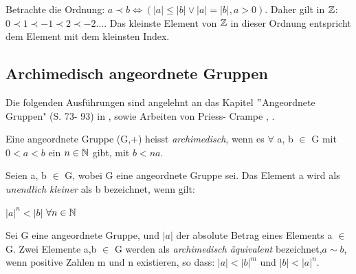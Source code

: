 %
\begin{bsp}
Betrachte die Ordnung: $ a\prec b \Leftrightarrow (|a| \le|b| \vee |a| = |b|, a > 0).$ \newline %
Daher gilt in $\mathbb{Z}$: $ 0 \prec 1 \prec -1 \prec 2 \prec -2 ...$. \newline
Das kleinste Element von $\mathbb{Z}$ in dieser Ordnung entspricht dem Element mit dem kleinsten Index. 
\end{bsp}
\subsection{Archimedisch angeordnete Gruppen}
%
Die folgenden Ausführungen sind angelehnt an das Kapitel $"$Angeordnete Gruppen" (S. 73- 93) in \cite{fuchs66}, sowie Arbeiten von Priess- Crampe \cite{priesscrampe69}, \cite{priesscrampe83}.
%
\begin{defn}\label{archim}
Eine angeordnete Gruppe (G,+) heisst \textit{archimedisch}, wenn es $\forall$ a, b $\in$ G  mit $0 < a < b$ ein $n \in \mathbb{N} $ gibt, mit $b < na$.
\end{defn}
%
%
\begin{defn}\label{uek}
Seien a, b $\in$ G, wobei G eine angeordnete Gruppe sei. Das Element a wird als \textit{unendlich kleiner} als b bezeichnet, wenn gilt: \\
\centerline{$|a|^n < |b|$  $\forall n \in \mathbb{N} $}
\end{defn}
%
\begin{defn}\label{aae}
Sei G eine angeordnete Gruppe, und $|a|$ der absolute Betrag eines Elements a $\in$ G. Zwei Elemente a,b $\in$ G werden als \textit{archimedisch äquivalent} bezeichnet,$ a \sim b $, wenn positive Zahlen m und n existieren, so dass: 
$|a| < |b|^m $ und $|b| < |a|^n$. 
\end{defn}
%
